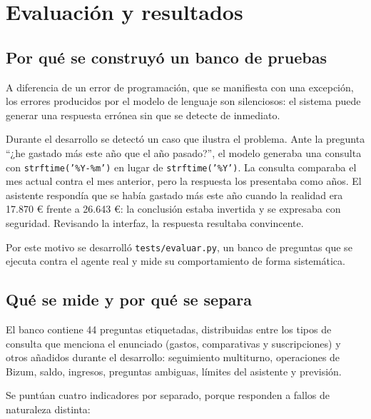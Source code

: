 \section{Evaluación y resultados}

\subsection{Por qué se construyó un banco de pruebas}

A diferencia de un error de programación, que se manifiesta con
una excepción, los errores producidos por el modelo de lenguaje son silenciosos: 
el sistema puede generar una respuesta errónea sin que se detecte de inmediato.

Durante el desarrollo se detectó un caso que ilustra el problema. Ante la
pregunta ``¿he gastado más este año que el año pasado?'', el modelo generaba una
consulta con \texttt{strftime('\%Y-\%m')} en lugar de \texttt{strftime('\%Y')}.
La consulta comparaba el mes actual contra el mes anterior, pero la respuesta
los presentaba como años. El asistente respondía que se había gastado más este
año cuando la realidad era 17.870 € frente a 26.643 €: la conclusión estaba
invertida y se expresaba con seguridad. Revisando la interfaz, la respuesta
resultaba convincente.

Por este motivo se desarrolló \texttt{tests/evaluar.py}, un banco de preguntas
que se ejecuta contra el agente real y mide su comportamiento de forma
sistemática.

\subsection{Qué se mide y por qué se separa}

El banco contiene 44 preguntas etiquetadas, distribuidas entre los tipos de
consulta que menciona el enunciado (gastos, comparativas y suscripciones) y
otros añadidos durante el desarrollo: seguimiento multiturno, operaciones de
Bizum, saldo, ingresos, preguntas ambiguas, límites del asistente y previsión.

Se puntúan cuatro indicadores por separado, porque responden a fallos de
naturaleza distinta:

